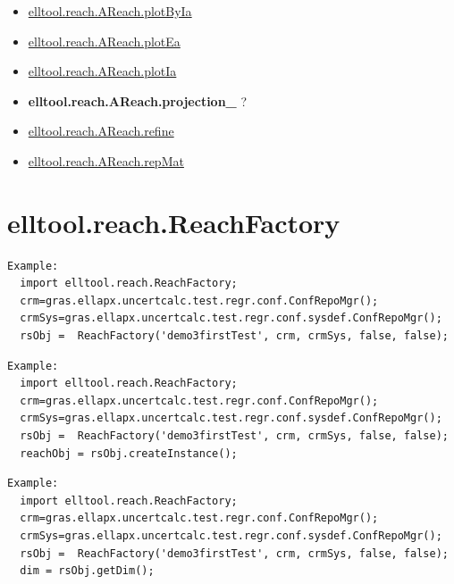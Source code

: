 \documentclass[letterpaper,10pt,english]{sphinxmanual}
\begin{document}
\begin{itemize}
\item {} 
{\hyperref[chap_func:elltool-reach-areach-plotbyia]{elltool.reach.AReach.plotByIa}}

\item {} 
{\hyperref[chap_func:elltool-reach-areach-plotea]{elltool.reach.AReach.plotEa}}

\item {} 
{\hyperref[chap_func:elltool-reach-areach-plotia]{elltool.reach.AReach.plotIa}}

\item {} 
{\color{red}\bfseries{}elltool.reach.AReach.projection\_} ?

\item {} 
{\hyperref[chap_func:elltool-reach-areach-refine]{elltool.reach.AReach.refine}}

\item {} 
{\hyperref[chap_func:elltool-reach-areach-repmat]{elltool.reach.AReach.repMat}}

\end{itemize}


\section{elltool.reach.ReachFactory}
\label{chap_func:elltool-reach-reachfactory}
\begin{Verbatim}[commandchars=\\\{\}]
Example:
  import elltool.reach.ReachFactory;
  crm=gras.ellapx.uncertcalc.test.regr.conf.ConfRepoMgr();
  crmSys=gras.ellapx.uncertcalc.test.regr.conf.sysdef.ConfRepoMgr();
  rsObj =  ReachFactory('demo3firstTest', crm, crmSys, false, false);
\end{Verbatim}

\begin{Verbatim}[commandchars=\\\{\}]
Example:
  import elltool.reach.ReachFactory;
  crm=gras.ellapx.uncertcalc.test.regr.conf.ConfRepoMgr();
  crmSys=gras.ellapx.uncertcalc.test.regr.conf.sysdef.ConfRepoMgr();
  rsObj =  ReachFactory('demo3firstTest', crm, crmSys, false, false);
  reachObj = rsObj.createInstance();
\end{Verbatim}

\begin{Verbatim}[commandchars=\\\{\}]
Example:
  import elltool.reach.ReachFactory;
  crm=gras.ellapx.uncertcalc.test.regr.conf.ConfRepoMgr();
  crmSys=gras.ellapx.uncertcalc.test.regr.conf.sysdef.ConfRepoMgr();
  rsObj =  ReachFactory('demo3firstTest', crm, crmSys, false, false);
  dim = rsObj.getDim();
\end{Verbatim}
\end{document}
